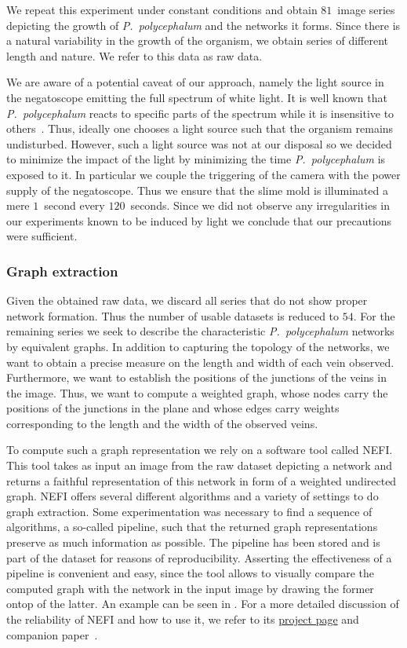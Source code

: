 	      We repeat this experiment under constant conditions and obtain $81$~image series depicting the growth of \emph{P.~polycephalum} and the networks it forms. Since there is a natural variability in the growth of the organism, we obtain series of different length and nature. We refer to this data as raw data.

	      We are aware of a potential caveat of our approach, namely the light source in the negatoscope emitting the full spectrum of white light. It is well known that \emph{P.~polycephalum} reacts to specific parts of the spectrum while it is insensitive to others~\cite{nakagaki1996action}. Thus, ideally one chooses a light source such that the organism remains undisturbed. However, such a light source was not at our disposal so we decided to minimize the impact of the light by minimizing the time \emph{P.~polycephalum} is exposed to it. In particular we couple the triggering of the camera with the power supply of the negatoscope. Thus we ensure that the slime mold is illuminated a mere $1$~second every $120$~seconds. Since we did not observe any irregularities in our experiments known to be induced by light we conclude that our precautions were sufficient.

	    \subsubsection{Graph extraction}

	      Given the obtained raw data, we discard all series that do not show proper network formation. Thus the number of usable datasets is reduced to $54$. For the remaining series we seek to describe the characteristic \emph{P.~polycephalum} networks by equivalent graphs. In addition to capturing the topology of the networks, we want to obtain a precise measure on the length and width of each vein observed. Furthermore, we want to establish the positions of the junctions of the veins in the image. Thus, we want to compute a weighted graph, whose nodes carry the positions of the junctions in the plane and whose edges carry weights corresponding to the length and the width of the observed veins. 

	      To compute such a graph representation we rely on a software tool called NEFI. This tool takes as input an image from the raw dataset depicting a network and returns a faithful representation of this network in form of a weighted undirected graph. NEFI offers several different algorithms and a variety of settings to do graph extraction. Some experimentation was necessary to find a sequence of algorithms, a so-called pipeline, such that the returned graph representations preserve as much information as possible. The pipeline has been stored and is part of the dataset for reasons of reproducibility. Asserting the effectiveness of a pipeline is convenient and easy, since the tool allows to visually compare the computed graph with the network in the input image by drawing the former ontop of the latter. An example can be seen in . For a more detailed discussion of the reliability of NEFI and how to use it, we refer to its \href{http://nefi.mpi-inf.mpg.de}{project page} and companion paper~\cite{dirnberger2015nefi}.

